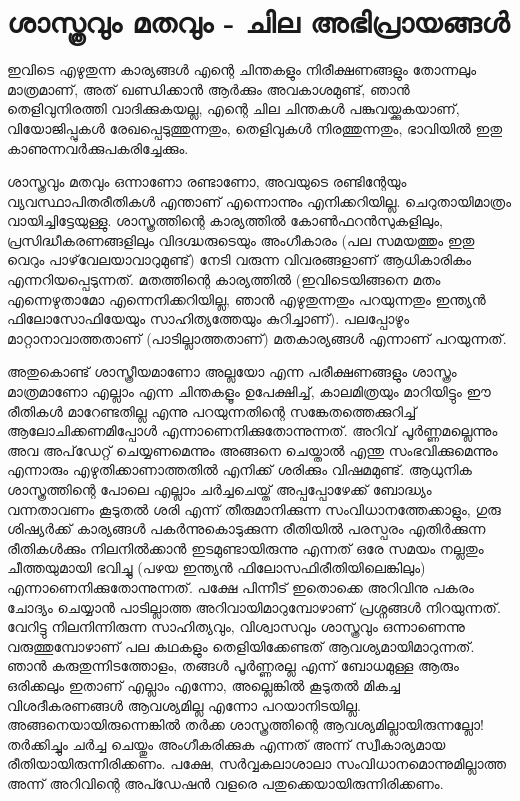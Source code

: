 \section*{ശാസ്ത്രവും മതവും - ചില അഭിപ്രായങ്ങള്‍}
\vskip 2pt

ഇവിടെ എഴുതുന്ന കാര്യങ്ങള്‍ എന്റെ ചിന്തകളും നിരീക്ഷണങ്ങളും തോന്നലും മാത്രമാണ്, അത് ഖണ്ഡിക്കാന്‍ ആര്‍ക്കും 
അവകാശമുണ്ട്, ഞാന്‍ തെളിവുനിരത്തി വാദിക്കുകയല്ല, എന്റെ ചില ചിന്തകള്‍ പങ്കുവയ്ക്കുകയാണ്, വിയോജിപ്പുകള്‍ 
രേഖപ്പെടുത്തുന്നതും, തെളിവുകള്‍ നിരത്തുന്നതും, ഭാവിയില്‍ ഇതു കാണുന്നവര്‍ക്കുപകരിച്ചേക്കും.

ശാസ്ത്രവും മതവും ഒന്നാണോ രണ്ടാണോ, അവയുടെ രണ്ടിന്റേയും വ്യവസ്ഥാപിതരീതികള്‍ എന്താണ് എന്നൊന്നും 
എനിക്കറിയില്ല. ചെറുതായിമാത്രം വായിച്ചിട്ടേയുള്ളു. ശാസ്ത്രത്തിന്റെ കാര്യത്തില്‍ കോണ്‍ഫറന്‍സുകളിലും, 
പ്രസിദ്ധീകരണങ്ങളിലും വിദഗ്ദ്ധരുടെയും അംഗീകാരം (പല സമയത്തും ഇതു വെറും പാഴ്‌വേലയാവാറുമുണ്ട്) നേടി വരുന്ന 
വിവരങ്ങളാണ് ആധികാരികം എന്നറിയപ്പെടുന്നത്. മതത്തിന്റെ കാര്യത്തില്‍ (ഇവിടെയിങ്ങനെ മതം എന്നെഴുതാമോ 
എന്നെനിക്കറിയില്ല, ഞാന്‍ എഴുതുന്നതും പറയുന്നതും ഇന്ത്യന്‍ ഫിലോസോഫിയേയും സാഹിത്യത്തേയും കുറിച്ചാണ്). 
പലപ്പോഴും മാറ്റാനാവാത്തതാണ് (പാടില്ലാത്തതാണ്) മതകാര്യങ്ങള്‍ എന്നാണ് പറയുന്നത്.

അതുകൊണ്ട് ശാസ്ത്രീയമാണോ അല്ലയോ എന്ന പരീക്ഷണങ്ങളും ശാസ്ത്രം മാത്രമാണോ എല്ലാം എന്ന ചിന്തകളൂം ഉപേക്ഷിച്ച്, 
കാലമിത്രയും മാറിയിട്ടും ഈ രീതികള്‍ മാറേണ്ടതില്ല എന്നു പറയുന്നതിന്റെ സങ്കേതത്തെക്കുറിച്ച് ആലോചിക്കണമിപ്പോള്‍ 
എന്നാണെനിക്കുതോന്നുന്നത്. അറിവ് പൂര്‍ണ്ണമല്ലെന്നും അവ അപ്‌ഡേറ്റ് ചെയ്യണമെന്നും അങ്ങനെ ചെയ്താല്‍ എന്തു 
സംഭവിക്കുമെന്നും എന്നാരും എഴുതിക്കാണാത്തതില്‍ എനിക്ക് ശരിക്കും വിഷമമുണ്ട്. ആധുനിക ശാസ്ത്രത്തിന്റെ പോലെ 
എല്ലാം ചര്‍ച്ചചെയ്ത് അപ്പപ്പോഴേക്ക് ബോദ്ധ്യം വന്നതാവണം കൂടുതല്‍ ശരി എന്ന് തീരുമാനിക്കുന്ന സംവിധാനത്തേക്കാളും, 
ഗുരു ശിഷ്യര്‍ക്ക് കാര്യങ്ങള്‍ പകര്‍ന്നുകൊടുക്കുന്ന രീതിയില്‍ പരസ്പരം എതിര്‍ക്കുന്ന രീതികള്‍ക്കും നിലനില്‍ക്കാന്‍ 
ഇടമുണ്ടായിരുന്നു എന്നത് ഒരേ സമയം നല്ലതും ചീത്തയുമായി ഭവിച്ചു (പഴയ ഇന്ത്യന്‍ ഫിലോസഫിരീതിയിലെങ്കിലും) 
എന്നാണെനിക്കുതോന്നുന്നത്. പക്ഷേ പിന്നീട് ഇതൊക്കെ അറിവിനു പകരം ചോദ്യം ചെയ്യാന്‍ പാടില്ലാത്ത അറിവായിമാറുമ്പോഴാണ് 
പ്രശ്നങ്ങള്‍ നിറയുന്നത്. വേറിട്ടു നിലനിന്നിരുന്ന സാഹിത്യവും, വിശ്വാസവും ശാസ്ത്രവും ഒന്നാണെന്നു വരുത്തുമ്പോഴാണ് 
പല കഥകളും തെളിയിക്കേണ്ടത് ആവശ്യമായിമാറുന്നത്. ഞാന്‍ കരുതുന്നിടത്തോളം, തങ്ങള്‍ പൂര്‍ണ്ണരല്ല എന്ന് ബോധമുള്ള 
ആരും ഒരിക്കലും ഇതാണ് എല്ലാം എന്നോ, അല്ലെങ്കില്‍ കൂടുതല്‍ മികച്ച വിശദീകരണങ്ങള്‍ ആവശ്യമില്ല എന്നോ പറയാനിടയില്ല. 
അങ്ങനെയായിരുന്നെങ്കില്‍ തര്‍ക്ക ശാസ്ത്രത്തിന്റെ ആവശ്യമില്ലായിരുന്നല്ലോ! തര്‍ക്കിച്ചും ചര്‍ച്ച ചെയ്തും അംഗീകരിക്കുക 
എന്നത് അന്ന് സ്വീകാര്യമായ രീതിയായിരുന്നിരിക്കണം. പക്ഷേ, സര്‍വ്വകലാശാലാ സംവിധാനമൊന്നുമില്ലാത്ത അന്ന് അറിവിന്റെ
അപ്ഡേഷന്‍ വളരെ പതുക്കെയായിരുന്നിരിക്കണം.

